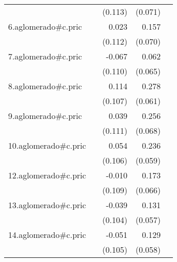 {\begin{longtable}{l*{4}{D{.}{.}{-1}}}
            &                     &     (0.113)         &     (0.071)         &                     \\
\addlinespace
6.aglomerado#c.pric&                     &       0.023         &       0.157\sym{*}  &                     \\
            &                     &     (0.112)         &     (0.070)         &                     \\
\addlinespace
7.aglomerado#c.pric&                     &      -0.067         &       0.062         &                     \\
            &                     &     (0.110)         &     (0.065)         &                     \\
\addlinespace
8.aglomerado#c.pric&                     &       0.114         &       0.278\sym{***}&                     \\
            &                     &     (0.107)         &     (0.061)         &                     \\
\addlinespace
9.aglomerado#c.pric&                     &       0.039         &       0.256\sym{***}&                     \\
            &                     &     (0.111)         &     (0.068)         &                     \\
\addlinespace
10.aglomerado#c.pric&                     &       0.054         &       0.236\sym{***}&                     \\
            &                     &     (0.106)         &     (0.059)         &                     \\
\addlinespace
12.aglomerado#c.pric&                     &      -0.010         &       0.173\sym{**} &                     \\
            &                     &     (0.109)         &     (0.066)         &                     \\
\addlinespace
13.aglomerado#c.pric&                     &      -0.039         &       0.131\sym{*}  &                     \\
            &                     &     (0.104)         &     (0.057)         &                     \\
\addlinespace
14.aglomerado#c.pric&                     &      -0.051         &       0.129\sym{*}  &                     \\
            &                     &     (0.105)         &     (0.058)         &                     \\

\end{longtable}}

